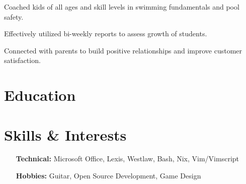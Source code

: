 \documentclass[letterpaper]{resume-shreeram}
\begin{document}
\begin{compactitem}
  \item
    Coached kids of all ages and skill levels in swimming fundamentals and pool safety.

  \item
    Effectively utilized bi-weekly reports to assess growth of students.

  \item
    Connected with parents to build positive relationships and improve customer satisfaction.
\end{compactitem}

\section{Education}



\section{Skills \& Interests}

\begin{itemize}
  \item[\bfseries Technical:]
    Microsoft Office, Lexis, Westlaw, Bash, Nix, Vim/Vimscript

  \item[\bfseries Hobbies:]
    Guitar, Open Source Development, Game Design
\end{itemize}
\end{document}

